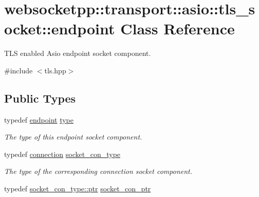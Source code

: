 \hypertarget{classwebsocketpp_1_1transport_1_1asio_1_1tls__socket_1_1endpoint}{}\section{websocketpp\+:\+:transport\+:\+:asio\+:\+:tls\+\_\+socket\+:\+:endpoint Class Reference}
\label{classwebsocketpp_1_1transport_1_1asio_1_1tls__socket_1_1endpoint}


T\+L\+S enabled Asio endpoint socket component.  




{\ttfamily \#include $<$tls.\+hpp$>$}

\subsection*{Public Types}
\begin{DoxyCompactItemize}
\item 
typedef \hyperlink{classwebsocketpp_1_1transport_1_1asio_1_1tls__socket_1_1endpoint}{endpoint} \hyperlink{classwebsocketpp_1_1transport_1_1asio_1_1tls__socket_1_1endpoint_adc98054310e74703eb102760e85f5cd9}{type}
\begin{DoxyCompactList}\small\item\em The type of this endpoint socket component. \end{DoxyCompactList}\item 
typedef \hyperlink{classwebsocketpp_1_1transport_1_1asio_1_1tls__socket_1_1connection}{connection} \hyperlink{classwebsocketpp_1_1transport_1_1asio_1_1tls__socket_1_1endpoint_a690393b3da13e389cf025f88a3d38f3f}{socket\+\_\+con\+\_\+type}
\begin{DoxyCompactList}\small\item\em The type of the corresponding connection socket component. \end{DoxyCompactList}\item 
typedef \hyperlink{classwebsocketpp_1_1transport_1_1asio_1_1tls__socket_1_1connection_a2aa605c27a476eba644e062dc5bc4f6d}{socket\+\_\+con\+\_\+type\+::ptr} \hyperlink{classwebsocketpp_1_1transport_1_1asio_1_1tls__socket_1_1endpoint_ad0babd14e53524633840467d072710c3}{socket\+\_\+con\+\_\+ptr}
\end{DoxyCompactItemize}
